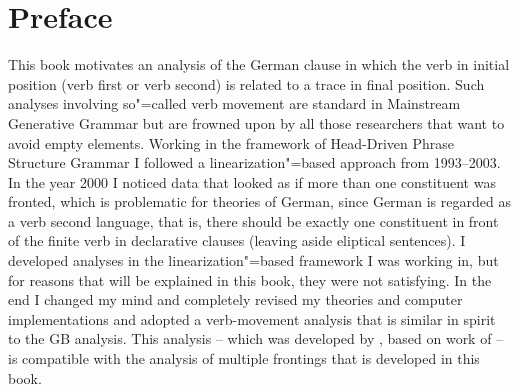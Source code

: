 










\frontmatter

\maketitle

\tableofcontents


\chapter*{Preface}

This book motivates an analysis of the German clause in which the verb in initial position (verb
first or verb second) is related to a trace in final position. Such analyses involving so"=called
verb movement are standard in Mainstream Generative Grammar but are frowned upon by all those
researchers that want to avoid empty elements. Working in the framework of Head-Driven Phrase
Structure Grammar I followed a linearization"=based approach \citep{Reape90a,Reape94a} from
1993--2003. In the year 2000 I noticed data that looked as if more than one constituent was fronted,
which is problematic for theories of German, since German is regarded as a verb second language,
that is, there should be exactly one constituent in front of the finite verb in declarative clauses
(leaving aside eliptical sentences). I developed analyses in the linearization"=based framework I
was working in, but for reasons that will be explained in this book, they were not satisfying. In
the end I changed my mind and completely revised my theories and computer implementations and
adopted a verb-movement analysis that is similar in spirit to the GB analysis. This analysis --
which was developed by \citet{Meurers99a}, based on work of \citet{KW91a,Kiss95a} -- is compatible
with the analysis of multiple frontings that is developed in this book. 

